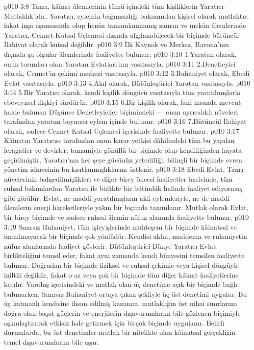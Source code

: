 \vs p010 3:8 Tanrı, kâinat âlemlerinin tümü içindeki tüm kişiliklerin Yaratıcı\hyp{}Mutlaklık’ıdır. Yaratıcı, eylemin bağımsızlığı bakımından kişisel olarak mutlaktır; fakat inşa aşamasında olup henüz tamamlanmamış zaman ve mekân âlemlerinde Yaratıcı, Cennet Kutsal Üçlemesi dışında algılanabilecek bir biçimde bütüncül İlahiyat olarak kutsal değildir.
\vs p010 3:9 İlk Kaynak ve Merkez, Havona’nın dışında şu olgular âlemlerinde faaliyette bulunur:
\vs p010 3:10 1.\bibnobreakspace Yaratan olarak, onun torunları olan Yaratan Evlatları’nın vasıtasıyla.
\vs p010 3:11 2.\bibnobreakspace Denetleyici olarak, Cennet’in çekimi merkezi vasıtasıyla.
\vs p010 3:12 3.\bibnobreakspace Ruhaniyet olarak, Ebedi Evlat vasıtasıyla.
\vs p010 3:13 4.\bibnobreakspace Akıl olarak, Bütünleştirici Yaratan vasıtasıyla.
\vs p010 3:14 5.\bibnobreakspace Bir Yaratıcı olarak, kendi kişilik döngüsü vasıtasıyla tüm yaratılmışlarla ebeveynsel ilişkiyi sürdürür.
\vs p010 3:15 6.\bibnobreakspace Bir kişilik olarak, fani insanda mevcut halde bulunan Düşünce Denetleyiciler biçimindeki --- onun ayrıcalıklı nüveleri tarafından yaratım boynuca  eylem içinde bulunur.
\vs p010 3:16 7.\bibnobreakspace Bütüncül İlahiyat olarak, sadece Cennet Kutsal Üçlemesi içerisinde faaliyette bulunur.
\vs p010 3:17 Kâinatın Yaratıcısı tarafından onun karar yetkisi dâhilindeki tüm bu yapılan feragatler ve devirler, tamamiyle gönüllü bir biçimde olup kendiliğinden hayata geçirilmiştir. Yaratıcı’nın her şeye gücünün yeterliliği, bilinçli bir biçimde evren yönetim idaresinin bu kısıtlanmışlıklarını üstlenir.
\vs p010 3:18 Ebedi Evlat, Tanrı nüvelerinin bahşedilmişlikleri ve diğer birey öncesi faaliyetler haricinde, tüm ruhsal bakımlardan Yaratıcı ile birlikte bir bütünlük halinde faaliyet ediyormuş gibi görülür. Evlat, ne maddi yaratılmışların akli eylemleriyle, ne de maddi âlemlerin enerji hareketleriyle yakın bir biçimde tanımlanır. Mutlak olarak Evlat, bir birey biçimde ve sadece ruhsal âlemin nüfuz alanında faaliyette bulunur.
\vs p010 3:19 Sınırsız Ruhaniyet, tüm işleyişlerinde muhteşem bir biçimde kâinatsal ve inanılmayacak bir biçimde çok yönlüdür. Kendisi aklın, maddenin ve ruhaniyetin nüfuz alanlarında faaliyet gösterir. Bütünleştirici Bünye Yaratıcı\hyp{}Evlat birlikteliğini temsil eder, fakat aynı zamanda kendi bünyesini temsilen faaliyette bulunur. Doğrudan bir biçimde fiziksel ve ruhsal çekimle veya kişisel döngüyle iniltili değildir, fakat o az veya çok bir biçimde tüm diğer kâinat faaliyetlerine katılır. Varoluş içerisindeki ve mutlak olan üç denetime açık bir biçimde bağlı bulunurken, Sınırsız Ruhaniyet ortaya çıkan şekliyle üç üst denetimi uygular. Bu üç katmanlı kendisine ihsan edilmiş kazanım, mutlaklığın üst nihai sınırlarına doğru olan başat güçlerin ve enerjilerin dışavurumlarını bile gözlenen biçimiyle aşkınlaştırarak etkisiz hale getirmek için birçok biçimde uygulanır. Belirli durumlarda, bu üst denetimler mutlak bir nitelikte olan kâinatsal gerçekliğin temel dışavurumlarını bile aşar.
